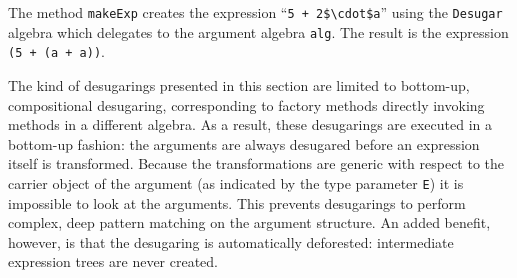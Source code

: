 
\noindent The method \lstinline{makeExp} creates the expression ``\lstinline[mathescape=true]{5 + 2$\cdot$a}'' using the \lstinline{Desugar} algebra which delegates to the argument algebra \lstinline{alg}. The result is the expression \lstinline{(5 + (a + a))}.

The kind of desugarings presented in this section are limited to bottom-up, compositional desugaring, corresponding to factory methods directly invoking methods in a different algebra. As a result, these desugarings are executed in a bottom-up fashion: the arguments are always desugared before an expression itself is transformed. Because the transformations are generic with respect to the carrier object of the argument (as indicated by the type parameter \lstinline{E}) it is impossible to look at the arguments. This prevents desugarings to perform complex, deep pattern matching on the argument structure. An added benefit, however, is that the desugaring is automatically deforested: intermediate expression trees are never created. 
